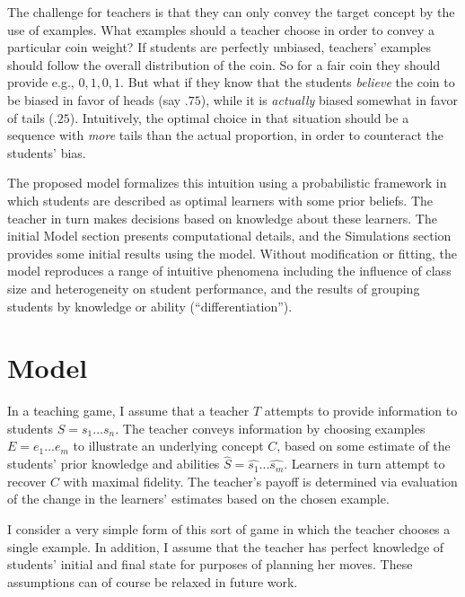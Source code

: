 \documentclass[10pt,letterpaper]{article}
\begin{document}
The challenge for teachers is that they can only convey the target concept by the use of examples. What examples should a teacher choose in order to convey a particular coin weight? If students are perfectly unbiased, teachers' examples should follow the overall distribution of the coin. So for a fair coin they should provide e.g., $0, 1, 0, 1$. But what if they know that the students \emph{believe} the coin to be biased in favor of heads (say $.75$), while it is \emph{actually} biased somewhat in favor of tails ($.25$). Intuitively, the optimal choice in that situation should be a sequence with \emph{more} tails than the actual proportion, in order to counteract the students' bias.

The proposed model formalizes this intuition using a probabilistic framework in which students are described as optimal learners with some prior beliefs.  The teacher in turn makes decisions based on knowledge about these learners. The initial Model section presents computational details, and the Simulations section provides some initial results using the model. Without modification or fitting, the model reproduces a range of intuitive phenomena including the influence of class size and heterogeneity on student performance, and the results of grouping students by knowledge or ability (``differentiation''). 

\section{Model}

In a teaching game, I assume that a teacher $T$ attempts to provide information to students $S = {s_1 ... s_n}$. The teacher conveys information by choosing examples $E = {e_1 ... e_m}$ to illustrate an underlying concept $C$, based on some estimate of the students' prior knowledge and abilities $\hat{S} = {\hat{s_1} ... \hat{s_m}}$. Learners in turn attempt to recover $C$ with maximal fidelity. The teacher's payoff is determined via evaluation of the change in the learners' estimates based on the chosen example.

I consider a very simple form of this sort of game in which the teacher chooses a single example. In addition, I assume that the teacher has perfect knowledge of students' initial and final state for purposes of planning her moves. These assumptions can of course be relaxed in future work.
\end{document}
